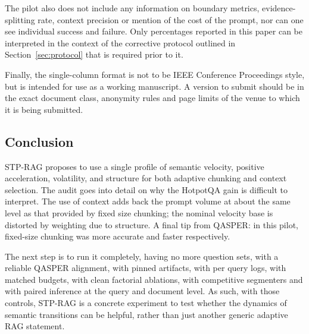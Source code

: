 \documentclass[10pt,a4paper]{article}
\begin{document}
The pilot also does not include any information on boundary metrics, evidence-splitting rate, context precision or mention of the cost of the prompt, nor can one see individual success and failure. Only percentages reported in this paper can be interpreted in the context of the corrective protocol outlined in Section~\ref{sec:protocol} that is required prior to it.

Finally, the single-column format is not to be IEEE Conference Proceedings style, but is intended for use as a working manuscript. A version to submit should be in the exact document class, anonymity rules and page limits of the venue to which it is being submitted.

\subsection{Conclusion}

STP-RAG proposes to use a single profile of semantic velocity, positive acceleration, volatility, and structure for both adaptive chunking and context selection. The audit goes into detail on why the HotpotQA gain is difficult to interpret. The use of context adds back the prompt volume at about the same level as that provided by fixed size chunking; the nominal velocity base is distorted by weighting due to structure. A final tip from QASPER: in this pilot, fixed-size chunking was more accurate and faster respectively.

The next step is to run it completely, having no more question sets, with a reliable QASPER alignment, with pinned artifacts, with per query logs, with matched budgets, with clean factorial ablations, with competitive segmenters and with paired inference at the query and document level. As such, with those controls, STP-RAG is a concrete experiment to test whether the dynamics of semantic transitions can be helpful, rather than just another generic adaptive RAG statement.

\printbibliography
\end{document}
